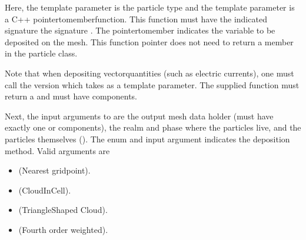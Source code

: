 \documentclass[letterpaper,10pt,english]{sphinxmanual}
\begin{document}
Here, the template parameter  is the particle type and the template parameter  is a C++ pointer\sphinxhyphen{}to\sphinxhyphen{}member\sphinxhyphen{}function.
This function must have the indicated signature   the signature .
The pointer\sphinxhyphen{}to\sphinxhyphen{}member  indicates the variable to be deposited on the mesh.
This function pointer does not need to return a member in the particle class.

Note that when depositing vector\sphinxhyphen{}quantities (such as electric currents), one must call the version which takes  as a template parameter.
The supplied function must return a  and  must have  components.

Next, the input arguments to  are the output mesh data holder (must have exactly one or  components), the realm and phase where the particles live, and the particles themselves ().
The enum  and input argument  indicates the deposition method.
Valid arguments are
\begin{itemize}
\item {} 
 (Nearest grid\sphinxhyphen{}point).

\item {} 
 (Cloud\sphinxhyphen{}In\sphinxhyphen{}Cell).

\item {} 
 (Triangle\sphinxhyphen{}Shaped Cloud).

\item {} 
  (Fourth order weighted).

\end{itemize}
\end{document}
